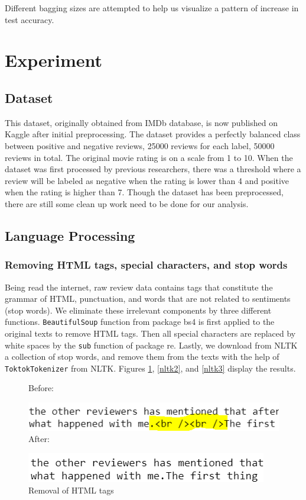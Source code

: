 \documentclass[10pt,twocolumn]{article}
\begin{document}
	Different bagging sizes are attempted to help us visualize a pattern of increase in test accuracy. 
	\section{Experiment}	
	\subsection{Dataset}
	This dataset, originally obtained from IMDb database, is now published on Kaggle after initial preprocessing. The dataset provides a perfectly balanced class between positive and negative reviews, 25000 reviews for each label, 50000 reviews in total. The original movie rating is on a scale from 1 to 10. When the dataset was first processed by previous researchers, there was a threshold where a review will be labeled as negative when the rating is lower than 4 and positive when the rating is higher than 7. Though the dataset has been preprocessed, there are still some clean up work need to be done for our analysis.
	\subsection{Language Processing}
	\subsubsection{Removing HTML tags, special characters, and stop words}
	Being read the internet, raw review data contains tags that constitute the grammar of HTML, punctuation, and words that are not related to sentiments (stop words). We eliminate these irrelevant components by three different functions. \texttt{BeautifulSoup} function from package bs4 is first applied to the original texts to remove HTML tags. Then all special characters are replaced by white spaces by the \texttt{sub} function of package re. Lastly, we download from NLTK a collection of stop words, and remove them from the texts with the help of \texttt{ToktokTokenizer} from NLTK. Figures \ref{nltk1}, \ref{nltk2}, and \ref{nltk3} display the results.
	
	\begin{figure}[H]
		\textsf{Before:}
		
		\includegraphics[width = \columnwidth]{html_tag}
		\textsf{After:}
		
		\includegraphics[width = \columnwidth]{html_tag_removed}
		\caption{Removal of HTML tags}\label{nltk1}
	\end{figure}
	
\end{document}
